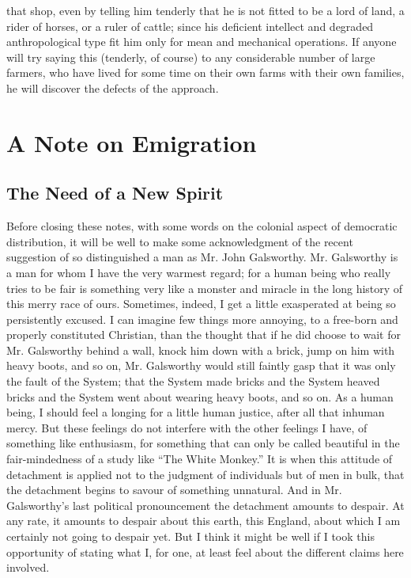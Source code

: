 \documentclass{book}
\begin{document}
that shop, even by telling him tenderly that he is not fitted to be a lord of land, a rider of horses, or a ruler of cattle; since his deficient intellect and degraded anthropological type fit him only for mean and mechanical operations. If anyone will try saying this (tenderly, of course) to any considerable number of large farmers, who have lived for some time on their own farms with their own families, he will discover the defects of the approach.

\setcounter{chapter}{0}\part{A Note on Emigration}
\label{chapter-19}
\chapter{The Need of a New Spirit}
\label{chapter-20}
Before closing these notes, with some words on the colonial aspect of democratic distribution, it will be well to make some acknowledgment of the recent suggestion of so distinguished a man as Mr. John Galsworthy. Mr. Galsworthy is a man for whom I have the very warmest regard; for a human being who really tries to be fair is something very like a monster and miracle in the long history of this merry race of ours. Sometimes, indeed, I get a little exasperated at being so persistently excused. I can imagine few things more annoying, to a free-born and properly constituted Christian, than the thought that if he did choose to wait for Mr. Galsworthy behind a wall, knock him down with a brick, jump on him with heavy boots, and so on, Mr. Galsworthy would still faintly gasp that it was only the fault of the System; that the System made bricks and the System heaved bricks and the System went about wearing heavy boots, and so on. As a human being, I should feel a longing for a little human justice, after all that inhuman mercy. But these feelings do not interfere with the other feelings I have, of something like enthusiasm, for something that can only be called beautiful in the fair-mindedness of a study like “The White Monkey.” It is when this attitude of detachment is applied not to the judgment of individuals but of men in bulk, that the detachment begins to savour of something unnatural. And in Mr. Galsworthy’s last political pronouncement the detachment amounts to despair. At any rate, it amounts to despair about this earth, this England, about which I am certainly not going to despair yet. But I think it might be well if I took this opportunity of stating what I, for one, at least feel about the different claims here involved.
\end{document}
